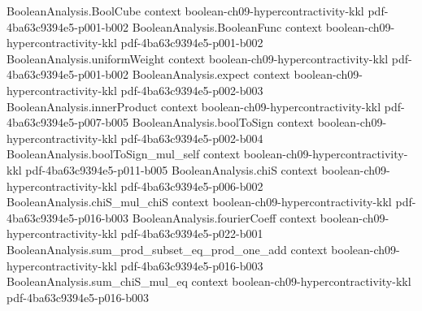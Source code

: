 \begin{theorem}
\leanok
{}
\label{BooleanAnalysis.Hypercontractivity.weak_two_function_hypercontractivity_one_bit}
\proofstep
  {BooleanAnalysis.BoolCube}
  {context}
  {boolean-ch09-hypercontractivity-kkl}
  {pdf-4ba63c9394e5-p001-b002}
\proofstep
  {BooleanAnalysis.BooleanFunc}
  {context}
  {boolean-ch09-hypercontractivity-kkl}
  {pdf-4ba63c9394e5-p001-b002}
\proofstep
  {BooleanAnalysis.uniformWeight}
  {context}
  {boolean-ch09-hypercontractivity-kkl}
  {pdf-4ba63c9394e5-p001-b002}
\proofstep
  {BooleanAnalysis.expect}
  {context}
  {boolean-ch09-hypercontractivity-kkl}
  {pdf-4ba63c9394e5-p002-b003}
\proofstep
  {BooleanAnalysis.innerProduct}
  {context}
  {boolean-ch09-hypercontractivity-kkl}
  {pdf-4ba63c9394e5-p007-b005}
\proofstep
  {BooleanAnalysis.boolToSign}
  {context}
  {boolean-ch09-hypercontractivity-kkl}
  {pdf-4ba63c9394e5-p002-b004}
\proofstep
  {BooleanAnalysis.boolToSign_mul_self}
  {context}
  {boolean-ch09-hypercontractivity-kkl}
  {pdf-4ba63c9394e5-p011-b005}
\proofstep
  {BooleanAnalysis.chiS}
  {context}
  {boolean-ch09-hypercontractivity-kkl}
  {pdf-4ba63c9394e5-p006-b002}
\proofstep
  {BooleanAnalysis.chiS_mul_chiS}
  {context}
  {boolean-ch09-hypercontractivity-kkl}
  {pdf-4ba63c9394e5-p016-b003}
\proofstep
  {BooleanAnalysis.fourierCoeff}
  {context}
  {boolean-ch09-hypercontractivity-kkl}
  {pdf-4ba63c9394e5-p022-b001}
\proofstep
  {BooleanAnalysis.sum_prod_subset_eq_prod_one_add}
  {context}
  {boolean-ch09-hypercontractivity-kkl}
  {pdf-4ba63c9394e5-p016-b003}
\proofstep
  {BooleanAnalysis.sum_chiS_mul_eq}
  {context}
  {boolean-ch09-hypercontractivity-kkl}
  {pdf-4ba63c9394e5-p016-b003}

\end{theorem}
